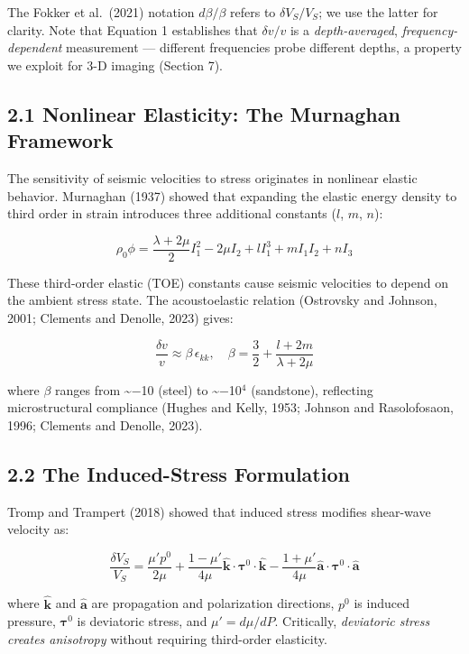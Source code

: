 \documentclass[draft]{agujournal2019}
\begin{document}
The Fokker et al.~(2021) notation \(d\beta/\beta\) refers to
\(\delta V_S/V_S\); we use the latter for clarity. Note that Equation 1
establishes that \(\delta v/v\) is a \emph{depth-averaged},
\emph{frequency-dependent} measurement --- different frequencies probe
different depths, a property we exploit for 3-D imaging (Section 7).

\subsection{2.1 Nonlinear Elasticity: The Murnaghan
Framework}\label{nonlinear-elasticity-the-murnaghan-framework}

The sensitivity of seismic velocities to stress originates in nonlinear
elastic behavior. Murnaghan (1937) showed that expanding the elastic
energy density to third order in strain introduces three additional
constants (\(l\), \(m\), \(n\)):

\[\rho_0 \phi = \frac{\lambda + 2\mu}{2} I_1^2 - 2\mu I_2 + l I_1^3 + m I_1 I_2 + n I_3 \tag{2}\]

These third-order elastic (TOE) constants cause seismic velocities to
depend on the ambient stress state. The acoustoelastic relation
(Ostrovsky and Johnson, 2001; Clements and Denolle, 2023) gives:

\[\frac{\delta v}{v} \approx \beta \, \epsilon_{kk}, \quad \beta = \frac{3}{2} + \frac{l + 2m}{\lambda + 2\mu} \tag{3}\]

where \(\beta\) ranges from \textasciitilde{}−10 (steel) to
\textasciitilde{}−10\(^4\) (sandstone), reflecting microstructural
compliance (Hughes and Kelly, 1953; Johnson and Rasolofosaon, 1996;
Clements and Denolle, 2023).

\subsection{2.2 The Induced-Stress
Formulation}\label{the-induced-stress-formulation}

Tromp and Trampert (2018) showed that induced stress modifies shear-wave
velocity as:

\[\frac{\delta V_S}{V_S} = \frac{\mu' p^0}{2\mu} + \frac{1 - \mu'}{4\mu} \hat{\mathbf{k}} \cdot \boldsymbol{\tau}^0 \cdot \hat{\mathbf{k}} - \frac{1 + \mu'}{4\mu} \hat{\mathbf{a}} \cdot \boldsymbol{\tau}^0 \cdot \hat{\mathbf{a}} \tag{4}\]

where \(\hat{\mathbf{k}}\) and \(\hat{\mathbf{a}}\) are propagation and
polarization directions, \(p^0\) is induced pressure,
\(\boldsymbol{\tau}^0\) is deviatoric stress, and \(\mu' = d\mu/dP\).
Critically, \emph{deviatoric stress creates anisotropy} without
requiring third-order elasticity.
\end{document}
